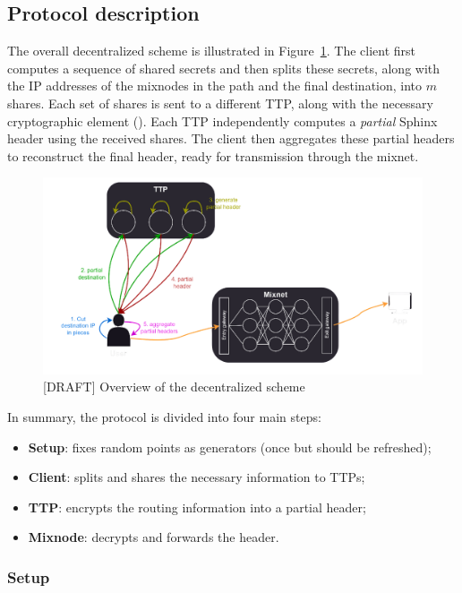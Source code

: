 \subsection{Protocol description}

The overall decentralized scheme is illustrated in Figure~\ref{fig:overall_schema}.  
The client first computes a sequence of shared secrets and then splits these secrets, along with the IP addresses of the mixnodes in the path and the final destination, into $m$ shares.  
Each set of shares is sent to a different TTP, along with the necessary cryptographic element (\A{}).  
Each TTP independently computes a \textit{partial} Sphinx header using the received shares.  
The client then aggregates these partial headers to reconstruct the final header, ready for transmission through the mixnet.

\begin{figure}[H]
    \centering
    \includegraphics[width=0.8\linewidth]{Images/sphinx_ttp.png}
    \caption{[DRAFT] Overview of the decentralized scheme}
    \label{fig:overall_schema}
\end{figure}

\noindent In summary, the protocol is divided into four main steps:
\begin{itemize}
    \item \textbf{Setup}: fixes random points as generators (once but should be refreshed);
    \item \textbf{Client}: splits and shares the necessary information to TTPs;
    \item \textbf{TTP}: encrypts the routing information into a partial header;
    \item \textbf{Mixnode}: decrypts and forwards the header.
\end{itemize}


\subsubsection{Setup}

